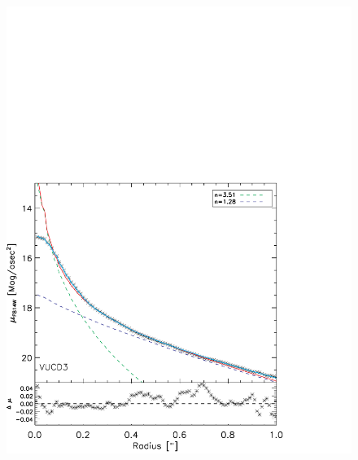 \documentclass{aastex}
\begin{document}
\begin{figure}[ht!]
  \centering
  \begin{minipage}{0.48\textwidth}
    \includegraphics[trim={0 0 0 10cm},clip,scale=0.47]{surfbright_hstindivsersic_center.pdf}%
  \end{minipage}
  \begin{minipage}{0.48\textwidth}

\end{minipage}
\end{figure}
\end{document}
